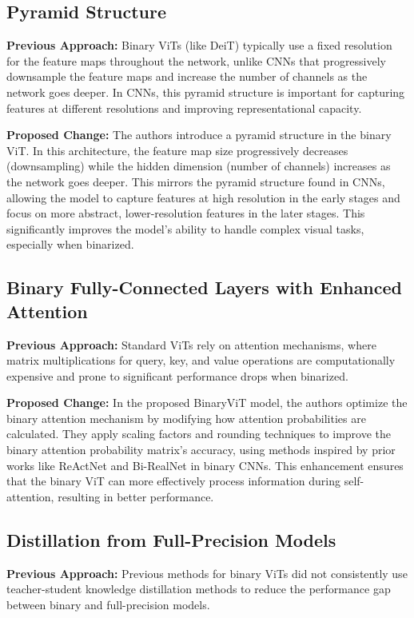 \documentclass{report}
\begin{document}
	
	
	
	
	
	\subsection{Pyramid Structure}
	\textbf{Previous Approach:} Binary ViTs (like DeiT) typically use a fixed resolution for the feature maps throughout the network, unlike CNNs that progressively downsample the feature maps and increase the number of channels as the network goes deeper. In CNNs, this pyramid structure is important for capturing features at different resolutions and improving representational capacity.
	
	\textbf{Proposed Change:} The authors introduce a pyramid structure in the binary ViT. In this architecture, the feature map size progressively decreases (downsampling) while the hidden dimension (number of channels) increases as the network goes deeper. This mirrors the pyramid structure found in CNNs, allowing the model to capture features at high resolution in the early stages and focus on more abstract, lower-resolution features in the later stages. This significantly improves the model’s ability to handle complex visual tasks, especially when binarized.
	
	
	
	\subsection{Binary Fully-Connected Layers with Enhanced Attention}
	\textbf{Previous Approach:} Standard ViTs rely on attention mechanisms, where matrix multiplications for query, key, and value operations are computationally expensive and prone to significant performance drops when binarized.
	
	\textbf{Proposed Change:} In the proposed BinaryViT model, the authors optimize the binary attention mechanism by modifying how attention probabilities are calculated. They apply scaling factors and rounding techniques to improve the binary attention probability matrix’s accuracy, using methods inspired by prior works like ReActNet and Bi-RealNet in binary CNNs. This enhancement ensures that the binary ViT can more effectively process information during self-attention, resulting in better performance.
	
	
	
	\subsection{Distillation from Full-Precision Models}
	\textbf{Previous Approach:} Previous methods for binary ViTs did not consistently use teacher-student knowledge distillation methods to reduce the performance gap between binary and full-precision models.
	
\end{document}
